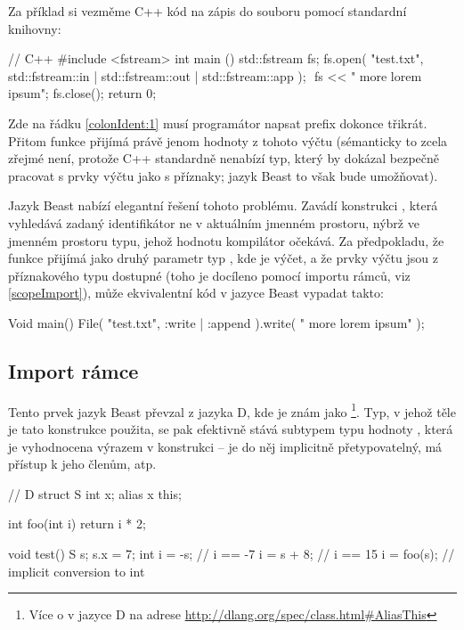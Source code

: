 Za příklad si vezměme C++ kód na zápis do souboru pomocí standardní knihovny:
\begin{cppcode}
// C++
#include <fstream>
int main () {
	std::fstream fs;
	fs.open( "test.txt", std::fstream::in | std::fstream::out | std::fstream::app ); $\label{colonIdent:1}$
	fs << " more lorem ipsum";
	fs.close();
	return 0;
}
\end{cppcode}

Zde na řádku \ref{colonIdent:1} musí programátor napsat prefix  dokonce třikrát. Přitom funkce  přijímá právě jenom hodnoty z tohoto výčtu (sémanticky to zcela zřejmé není, protože C++ standardně nenabízí typ, který by dokázal bezpečně pracovat s prvky výčtu jako s příznaky; jazyk Beast to však bude umožňovat).

Jazyk Beast nabízí elegantní řešení tohoto problému. Zavádí konstrukci , která vyhledává zadaný identifikátor ne v aktuálním jmenném prostoru, nýbrž ve jmenném prostoru typu, jehož hodnotu kompilátor očekává. Za předpokladu, že funkce  přijímá jako druhý parametr typ , kde  je výčet, a že prvky výčtu jsou z příznakového typu dostupné (toho je docíleno pomocí importu rámců, viz \autoref{scopeImport}), může ekvivalentní kód v jazyce Beast vypadat takto:
\begin{code}
Void main() {
	File( "test.txt", :write | :append ).write( " more lorem ipsum" );
}
\end{code}

\subsection{Import rámce} \label{scopeImport}
Tento prvek jazyk Beast převzal z jazyka D, kde je znám jako \footnote{Více o  v jazyce D na adrese \url{http://dlang.org/spec/class.html\#AliasThis}}. Typ, v jehož těle je tato konstrukce použita, se pak efektivně stává subtypem typu hodnoty , která je vyhodnocena výrazem v konstrukci  -- je do něj implicitně přetypovatelný, má přístup k jeho členům, atp.

\begin{dcode}
// D
struct S
{
	int x;
	alias x this;
}

int foo(int i) { return i * 2; }

void test()
{
	S s;
	s.x = 7;
	int i = -s;  // i == -7
	i = s + 8;   // i == 15
	i = foo(s);  // implicit conversion to int
}
\end{dcode}

